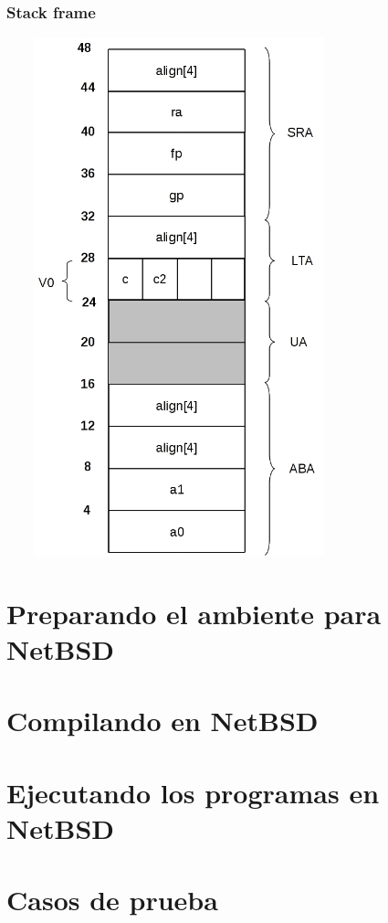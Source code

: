 \documentclass[a4paper,10pt]{article}
\begin{document}
    \subsubsection{Stack frame}
      \begin{center}
	\includegraphics[width=10cm, height=15cm]{DibujosStackFrame/stack-traducirFormato.jpg}
      \end{center}

 
\section{Preparando el ambiente para NetBSD}
 
\section{Compilando en NetBSD}

\section{Ejecutando los programas en NetBSD}

\section{Casos de prueba}
\end{document}
